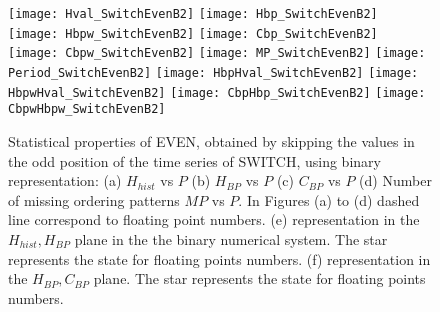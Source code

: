 
\begin{figure}
	\texttt{[image: Hval\_SwitchEvenB2]}
	\texttt{[image: Hbp\_SwitchEvenB2]}
	\texttt{[image: Hbpw\_SwitchEvenB2]}
	\texttt{[image: Cbp\_SwitchEvenB2]}
	\texttt{[image: Cbpw\_SwitchEvenB2]}
	\texttt{[image: MP\_SwitchEvenB2]}
	\texttt{[image: Period\_SwitchEvenB2]}
	\texttt{[image: HbpHval\_SwitchEvenB2]}
	\texttt{[image: HbpwHval\_SwitchEvenB2]}
	\texttt{[image: CbpHbp\_SwitchEvenB2]}
	\texttt{[image: CbpwHbpw\_SwitchEvenB2]}
\caption{Statistical properties of EVEN, obtained by skipping the values in the odd position of the time series of  SWITCH,  using binary representation: (a) $H_{hist}$ vs $P$ (b) $H_{BP}$ vs $P$ (c) $C_{BP}$ vs $P$ (d) Number of missing ordering patterns $MP$ vs $P$. In Figures (a) to (d) dashed line correspond to floating point numbers. (e) representation in the $H_{hist},H_{BP}$ plane in the the binary numerical system.  The star represents the state for floating points numbers. (f) representation in the $H_{BP},C_{BP}$ plane.  The star represents the state for floating points numbers.  } \label{fig:seqimparbin}
\end{figure}


